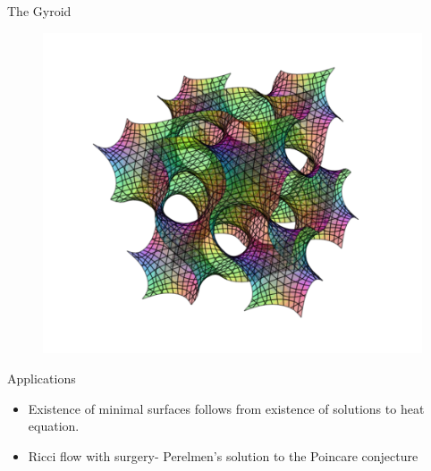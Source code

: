 \documentclass[usenames,dvipsnames]{beamer}
\theoremstyle{definition}
\theoremstyle{theorem}
\begin{document}
\begin{frame}{The Gyroid}
    \begin{figure}[H]
        \centering
        \includegraphics[width=.6\textwidth]{images/gyroid_fixed.png}
    \end{figure}
\end{frame}

\begin{frame}{Applications}
\begin{itemize}
    \item Existence of minimal surfaces follows from existence of solutions to heat equation.
    \item Ricci flow with surgery- Perelmen's solution to the Poincare conjecture
\end{itemize}
\end{frame}
        
        
    
\end{document}
